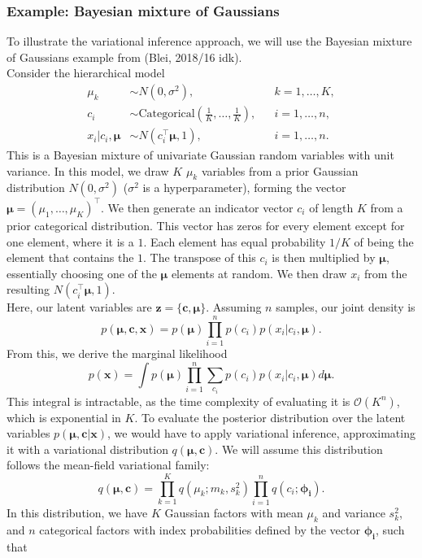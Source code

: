 \documentclass[a4paper,12pt]{article}
\numberwithin{equation}{section}
\begin{document}
\subsubsection{Example: Bayesian mixture of Gaussians}
To illustrate the variational inference approach, we will use the Bayesian mixture of Gaussians example from (Blei, 2018/16 idk).\\
Consider the hierarchical model
\begin{align*}
\mu_k&\sim N(0,\sigma^2), &&k=1,\dots,K,\\
c_i&\sim \text{Categorical}\left(\frac{1}{K},\dots,\frac{1}{K}\right), &&i=1,\dots,n,\\
x_i|c_i,\bm{\mu}&\sim N(c^\top_i\bm{\mu},1), &&i=1,\dots,n.
\end{align*}
This is a Bayesian mixture of univariate Gaussian random variables with unit variance. In this model, we draw $K$ $\mu_k$ variables from a prior Gaussian distribution $N(0,\sigma^2)$ ($\sigma^2$ is a hyperparameter), forming the vector $\bm{\mu}=(\mu_1,\dots,\mu_K)^\top$. We then generate an indicator vector $c_i$ of length $K$ from a prior categorical distribution. This vector has zeros for every element except for one element, where it is a $1$. Each element has equal probability $1/K$ of being the element that contains the $1$. The transpose of this $c_i$ is then multiplied by $\bm{\mu}$, essentially choosing one of the $\bm{\mu}$ elements at random. We then draw $x_i$ from the resulting $N(c^\top_i\bm{\mu},1)$.\\
Here, our latent variables are $\textbf{z}=\{\textbf{c},\bm{\mu}\}$. Assuming $n$ samples, our joint density is
\begin{equation}
p(\bm{\mu},\textbf{c},\textbf{x})=p(\bm{\mu})\prod^n_{i=1}p(c_i)p(x_i|c_i, \bm{\mu}).\end{equation}
From this, we derive the marginal likelihood
\[p(\textbf{x})=\int p(\bm{\mu})\prod^n_{i=1}\sum_{c_i}p(c_i)p(x_i|c_i,\bm{\mu})d\bm{\mu}.\]
This integral is intractable, as the time complexity of evaluating it is $\mathcal{O}(K^n)$, which is exponential in $K$. To evaluate the posterior distribution over the latent variables $p(\bm{\mu},\textbf{c}|\textbf{x})$, we would have to apply variational inference, approximating it with a variational distribution $q(\bm{\mu},\textbf{c})$. We will assume this distribution follows the mean-field variational family:
\[q(\bm{\mu},\textbf{c})=\prod^K_{k=1}q(\mu_k;m_k,s^2_k)\prod^n_{i=1}q(c_i;\bm{\phi_i}).\]
In this distribution, we have $K$ Gaussian factors with mean $\mu_k$ and variance $s^2_k$, and $n$ categorical factors with index probabilities defined by the vector $\bm{\phi_i}$, such that
\end{document}
